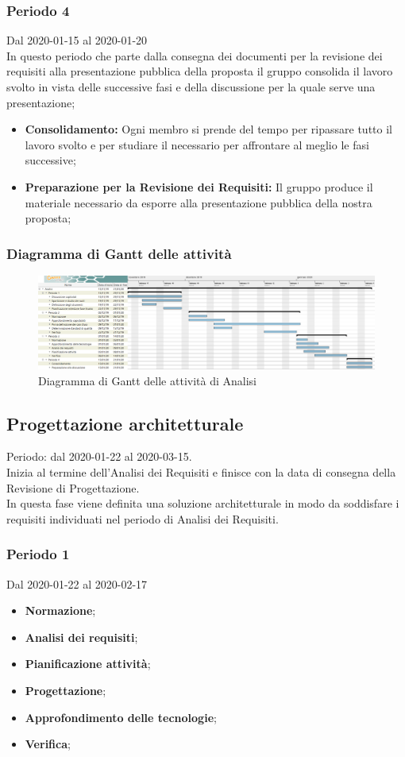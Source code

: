 \subsubsection{Periodo 4} 
Dal 2020-01-15 al 2020-01-20\\
In questo periodo che parte dalla consegna dei documenti per la revisione dei requisiti alla presentazione pubblica della proposta il gruppo consolida il lavoro svolto in vista delle successive fasi e della discussione per la quale serve una presentazione;
\begin{itemize}
	\item \textbf{Consolidamento:} Ogni membro si prende del tempo per ripassare tutto il lavoro svolto e per studiare il necessario per affrontare al meglio le fasi successive;
	\item \textbf{Preparazione per la Revisione dei Requisiti:} Il gruppo produce il materiale necessario da esporre alla presentazione pubblica della nostra proposta;
\end{itemize}
\subsubsection{Diagramma di Gantt delle attività}
\begin{figure}[h]
	\includegraphics[scale=0.45]{sezioni/DiagrammiGantt/Analisi.png}
	\caption{Diagramma di Gantt delle attività di Analisi}
\end{figure}


\subsection{Progettazione architetturale}
Periodo: dal 2020-01-22 al 2020-03-15.
\\Inizia al termine dell'Analisi dei Requisiti e finisce con la data di consegna della Revisione di Progettazione.
\\In questa fase viene definita una soluzione architetturale in modo da soddisfare i requisiti individuati nel periodo di Analisi dei Requisiti.

\subsubsection{Periodo 1} 
Dal 2020-01-22 al 2020-02-17
\begin{itemize}
	\item \textbf{Normazione};
	\item \textbf{Analisi dei requisiti};
	\item \textbf{Pianificazione attività};
	\item \textbf{Progettazione};
	\item \textbf{Approfondimento delle tecnologie};
	\item \textbf{Verifica};
\end{itemize}
